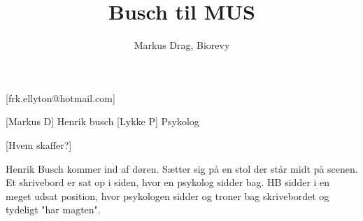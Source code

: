 \documentclass[a4paper,12pt]{article}
\title{Busch til MUS}
\author{Markus Drag, Biorevy}
\begin{document}
\maketitle

\begin{texxers}
	[frk.ellyton@hotmail.com]
\end{texxers}

\begin{roles}
	[Markus D] Henrik busch
	[Lykke P] Psykolog
\end{roles}


\begin{props}
	[Hvem skaffer?] 
\end{props}

\begin{sketch}

\scene Henrik Busch kommer ind af døren. Sætter sig på en stol der står midt på scenen. Et skrivebord er sat op i siden, hvor en psykolog sidder bag. HB sidder i en meget udsat position, hvor psykologen sidder og troner bag skrivebordet og tydeligt "har magten".


\end{sketch}
\end{document}
